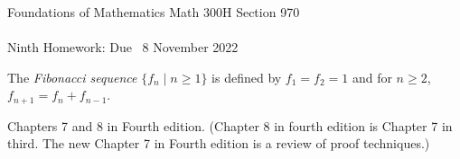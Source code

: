 \documentclass[12pt]{article}
\newcommand{\demph}[1]{{\color{blue}\sl{#1}}}
\begin{document}
\LARGE 
\noindent
{\color{Maroon}Foundations of Mathematics \hfill Math 300H Section 970}\vspace{2pt}\\
\Large \vspace{2pt}\\
\large
Ninth Homework: \hfill Due \  8 November 2022
\normalsize\medskip


\noindent{\color{blue}\rule{528.3675pt}{2pt}}


The \demph{Fibonacci sequence} $\{f_n\mid n\geq 1\}$ is defined by $f_1=f_2=1$ and for $n\geq 2$, $f_{n+1}=f_{n}+f_{n-1}$.

   Chapters 7 and 8 in Fourth edition.
(Chapter 8 in fourth edition is Chapter 7 in third.  The new Chapter 7 in Fourth edition is a review of proof techniques.)


\noindent{\color{blue}\rule{528.3675pt}{2pt}}
\end{document}

